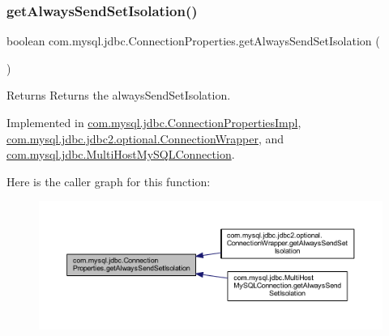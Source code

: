 \subsubsection{\texorpdfstring{get\+Always\+Send\+Set\+Isolation()}{getAlwaysSendSetIsolation()}}
{\footnotesize\ttfamily boolean com.\+mysql.\+jdbc.\+Connection\+Properties.\+get\+Always\+Send\+Set\+Isolation (\begin{DoxyParamCaption}{ }\end{DoxyParamCaption})}

\begin{DoxyReturn}{Returns}
Returns the always\+Send\+Set\+Isolation. 
\end{DoxyReturn}


Implemented in \mbox{\hyperlink{classcom_1_1mysql_1_1jdbc_1_1_connection_properties_impl_a38ee7b9e4456b9a7c58c9840a21403f6}{com.\+mysql.\+jdbc.\+Connection\+Properties\+Impl}}, \mbox{\hyperlink{classcom_1_1mysql_1_1jdbc_1_1jdbc2_1_1optional_1_1_connection_wrapper_af45029b8d8ad9603e6d77537609fc193}{com.\+mysql.\+jdbc.\+jdbc2.\+optional.\+Connection\+Wrapper}}, and \mbox{\hyperlink{classcom_1_1mysql_1_1jdbc_1_1_multi_host_my_s_q_l_connection_afdb9d1814ebb8c261112e3c959aaf10b}{com.\+mysql.\+jdbc.\+Multi\+Host\+My\+S\+Q\+L\+Connection}}.

Here is the caller graph for this function\+:\nopagebreak
\begin{figure}[H]
\begin{center}
\leavevmode
\includegraphics[width=350pt]{interfacecom_1_1mysql_1_1jdbc_1_1_connection_properties_a157a33612cbef9f88801ad8f2a4209b4_icgraph}
\end{center}
\end{figure}
\mbox{\label{interfacecom_1_1mysql_1_1jdbc_1_1_connection_properties_aee9fe485d01db5f2c0094702cd16468e}} 
